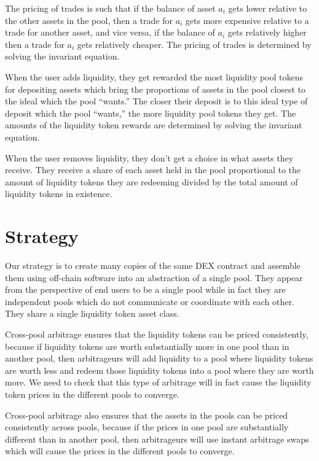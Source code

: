 \documentclass[12pt]{article}
\begin{document}
The pricing of trades is such that if the balance of asset $a_i$ gets lower relative to the other assets
in the pool, then a trade for $a_i$ gets more
expensive relative to a trade for another asset, and vice versa, if the balance of $a_i$ gets relatively higher
then a trade for $a_i$ gets relatively cheaper. The pricing of trades is determined by solving the invariant equation.

When the user adds liquidity, they get rewarded the most liquidity pool tokens for depositing assets which
bring the proportions of assets in the pool closest to the ideal which the pool ``wants.'' The closer their
deposit is to this ideal type of deposit which the pool ``wants,'' the more liquidity pool tokens they get. The
amounts of the liquidity token rewards are determined by solving the invariant equation.

When the user removes liquidity, they don't get a choice in what assets they receive. They receive a share of
each asset held in the pool proportional to the amount of liquidity tokens they are redeeming divided by
the total amount of liquidity tokens in existence.

\section{Strategy}

Our strategy is to create many copies of the same DEX contract and assemble them using off-chain software into
an abstraction of a single pool. They appear from the perspective of end users to be a single pool while in
fact they are independent pools which do not communicate or coordinate with each other. They share a single
liquidity token asset class.

Cross-pool arbitrage ensures that the liquidity tokens can be priced consistently,
because if liquidity tokens are worth substantially more in one pool than in another pool, then arbitrageurs
will add liquidity to a pool where liquidity tokens are worth less and redeem those liquidity tokens into
a pool where they are worth more. We need to check that this type of arbitrage will in fact cause the
liquidity token prices in the different pools to converge.

Cross-pool arbitrage also ensures that the assets in the pools can be priced consistently across pools,
because if the prices in one pool are substantially different than in another pool, then arbitrageurs
will use instant arbitrage swaps which will cause the prices in the different pools to converge.
\end{document}
